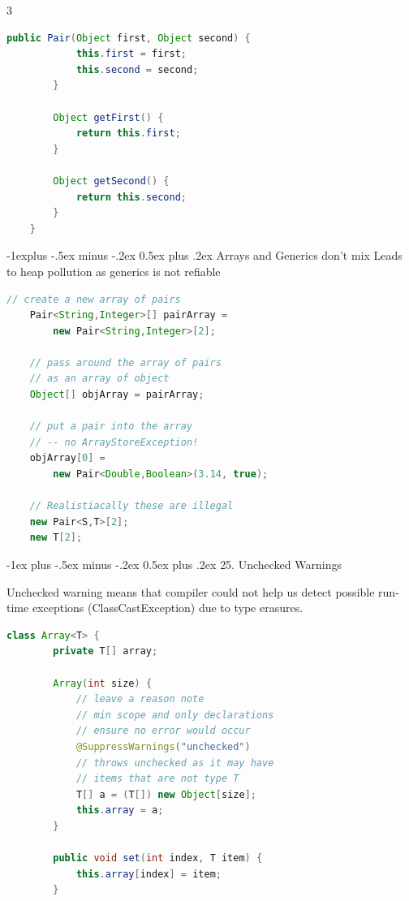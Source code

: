 \documentclass[10pt,landscape]{article}
\makeatletter
\renewcommand{\section}{\@startsection{section}{1}{0mm}%
    {-1ex plus -.5ex minus -.2ex}%
    {0.5ex plus .2ex}%
    {\normalfont\large\bfseries}}
\renewcommand{\subsection}{\@startsection{subsection}{2}{0mm}%
    {-1explus -.5ex minus -.2ex}%
    {0.5ex plus .2ex}%
    {\normalfont\normalsize\bfseries}}
\makeatother
\begin{document}
\begin{multicols*}{3}
\begin{lstlisting}[showstringspaces=false, language=Java, xleftmargin=-.3in]
        public Pair(Object first, Object second) {
            this.first = first;
            this.second = second;
        }
        
        Object getFirst() {
            return this.first;
        }
        
        Object getSecond() {
            return this.second;
        }
    }
    \end{lstlisting}
    \subsection{Arrays and Generics don't mix}
    Leads to heap pollution as generics is not refiable
    \begin{lstlisting}[showstringspaces=false, language=Java, xleftmargin=-.3in]
    // create a new array of pairs
    Pair<String,Integer>[] pairArray = 
        new Pair<String,Integer>[2];
    
    // pass around the array of pairs 
    // as an array of object
    Object[] objArray = pairArray;
    
    // put a pair into the array 
    // -- no ArrayStoreException!
    objArray[0] = 
        new Pair<Double,Boolean>(3.14, true);
    
    // Realistiacally these are illegal
    new Pair<S,T>[2];
    new T[2];
    \end{lstlisting}
    \begin{mdframed}
        \section{25. Unchecked Warnings}
    \end{mdframed}
    Unchecked warning means that compiler could not help us detect possible run-time
    exceptions (ClassCastException) due to type erasures.
    \begin{lstlisting}[showstringspaces=false, language=Java, xleftmargin=-.3in]
    class Array<T> {
        private T[] array;

        Array(int size) {
            // leave a reason note
            // min scope and only declarations
            // ensure no error would occur
            @SuppressWarnings("unchecked")
            // throws unchecked as it may have
            // items that are not type T
            T[] a = (T[]) new Object[size];
            this.array = a;
        }

        public void set(int index, T item) {
            this.array[index] = item;
        }


\end{lstlisting}
\end{multicols*}
\end{document}
